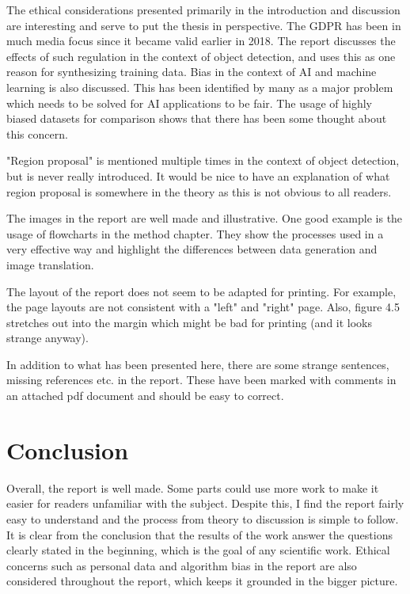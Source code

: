 \documentclass[11pt,a4paper]{article}
\begin{document}
	The ethical considerations presented primarily in the introduction and discussion are interesting and serve to put the thesis in perspective. The GDPR has been in much media focus since it became valid earlier in 2018. The report discusses the effects of such regulation in the context of object detection, and uses this as one reason for synthesizing training data. Bias in the context of AI and machine learning is also discussed. This has been identified by many as a major problem which needs to be solved for AI applications to be fair. The usage of highly biased datasets for comparison shows that there has been some thought about this concern.
	
	"Region proposal" is mentioned multiple times in the context of object detection, but is never really introduced. It would be nice to have an explanation of what region proposal is somewhere in the theory as this is not obvious to all readers.
	
	The images in the report are well made and illustrative. One good example is the usage of flowcharts in the method chapter. They show the processes used in a very effective way and highlight the differences between data generation and image translation.
	
	The layout of the report does not seem to be adapted for printing. For example, the page layouts are not consistent with a "left" and "right" page. Also, figure 4.5 stretches out into the margin which might be bad for printing (and it looks strange anyway).
	
	In addition to what has been presented here, there are some strange sentences, missing references etc. in the report. These have been marked with comments in an attached pdf document and should be easy to correct.
	
	\section*{Conclusion}
	Overall, the report is well made. Some parts could use more work to make it easier for readers unfamiliar with the subject. Despite this, I find the report fairly easy to understand and the process from theory to discussion is simple to follow. It is clear from the conclusion that the results of the work answer the questions clearly stated in the beginning, which is the goal of any scientific work. Ethical concerns such as personal data and algorithm bias in the report are also considered throughout the report, which keeps it grounded in the bigger picture.
	
\end{document}
